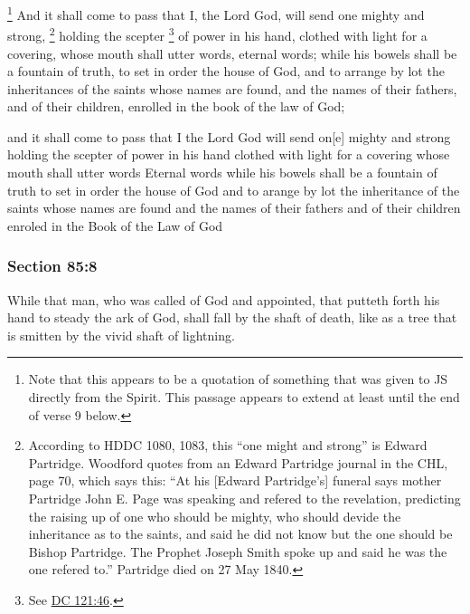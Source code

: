 			\footnote{%
				Note that this appears to be a quotation of something that was given to JS directly from the Spirit. This passage appears to extend at least until the end of verse 9 below.
				}%
		And it shall come to pass that I, the Lord God, will send one mighty and strong,%
			\footnote{%
				According to HDDC 1080, 1083, this ``one might and strong'' is Edward Partridge. Woodford quotes from an Edward Partridge journal in the CHL, page 70, which says this: ``At his [Edward Partridge's] funeral says mother Partridge John E. Page was speaking and refered to the revelation, predicting the raising up of one who should be mighty, who should devide the inheritance as to the saints, and said he did not know but the one should be Bishop Partridge. The Prophet Joseph Smith spoke up and said he was the one refered to.'' Partridge died on 27 May 1840.
				}
		holding the scepter%
			\footnote{%
				See \hyperref[DC121-46]{DC 121:46}.
				}
		of power in his hand, clothed with light for a covering, whose mouth shall utter words, eternal words; while his bowels shall be a fountain of truth, to set in order the house of God, and to arrange by lot the inheritances of the saints whose names are found, and the names of their fathers, and of their children, enrolled in the book of the law of God;

		\begin{framed}
		\scriptsize
			\begin{compactdesc}
				\item[JSP] and it shall come to pass that I the Lord God will send on[e] mighty and strong holding the scepter of power in his hand clothed with light for a covering whose mouth shall utter words Eternal words while his bowels shall be a fountain of truth to set in order the house of God and to arange by lot the inheritance of the saints whose names are found and the names of their fathers and of their children enroled in the Book of the Law of God
			\end{compactdesc}
		\end{framed}

	\subsubsection{Section 85:8} %
		\label{DC85-8}

		While that man, who was called of God and appointed, that putteth forth his hand to steady the ark of God, shall fall by the shaft of death, like as a tree that is smitten by the vivid shaft of lightning.

